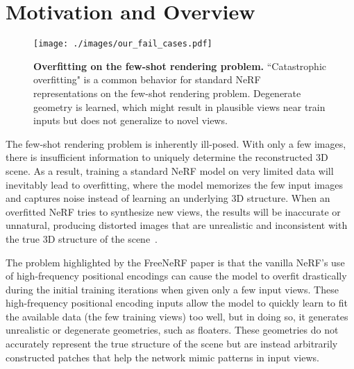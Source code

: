 \section{Motivation and Overview}
\label{sec:motivation}
\begin{figure*}[t]
	\centering
    \vspace{-1em}
	\texttt{[image: ./images/our\_fail\_cases.pdf]}
	\caption{\textbf{Overfitting on the few-shot rendering problem.} ``Catastrophic overfitting" is a common behavior for standard NeRF representations on the few-shot rendering problem. Degenerate geometry is learned, which might result in plausible views near train inputs but does not generalize to novel views. }
    \vspace{-1em}
	\label{fig:fail_cases}
\end{figure*}

The few-shot rendering problem is inherently ill-posed.
With only a few images, there is insufficient information to uniquely determine the reconstructed 3D scene.
As a result, training a standard NeRF model on very limited data will inevitably lead to overfitting, where the model memorizes the few input images and captures noise instead of learning an underlying 3D structure.
When an overfitted NeRF tries to synthesize new views, the results will be inaccurate or unnatural, producing distorted images that are unrealistic and inconsistent with the true 3D structure of the scene~\cite{yang2023freenerf,yu2021pixelnerf}.


The problem highlighted by the FreeNeRF paper is that the vanilla NeRF's use of high-frequency positional encodings can cause the model to overfit drastically during the initial training iterations when given only a few input views. These high-frequency positional encoding inputs allow the model to quickly learn to fit the available data (the few training views) too well, but in doing so, it generates unrealistic or degenerate geometries, such as floaters. These geometries do not accurately represent the true structure of the scene but are instead arbitrarily constructed patches that help the network mimic patterns in input views.

